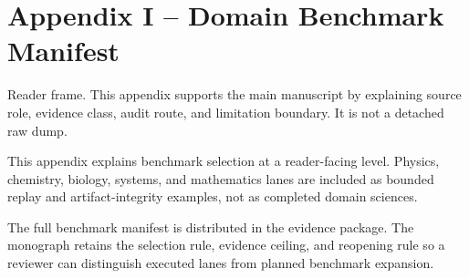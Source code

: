 \section{Appendix I -- Domain Benchmark Manifest}
Reader frame. This appendix supports the main manuscript by explaining source role, evidence class, audit route, and limitation boundary. It is not a detached raw dump.


\label{sec:oc-core-1-3-domain-benchmark-manifest-summary}

This appendix explains benchmark selection at a reader-facing level. Physics, chemistry, biology, systems, and mathematics lanes are included as bounded replay and artifact-integrity examples, not as completed domain sciences.


The full benchmark manifest is distributed in the evidence package. The monograph retains the selection rule, evidence ceiling, and reopening rule so a reviewer can distinguish executed lanes from planned benchmark expansion.
